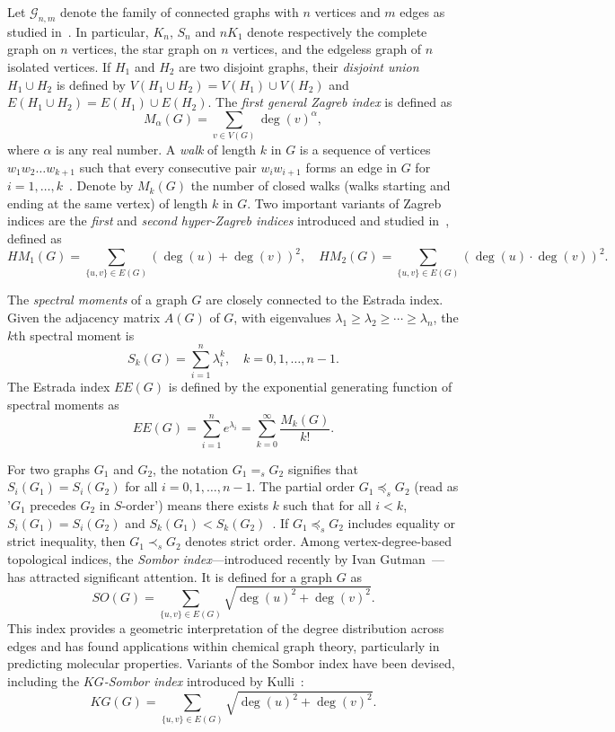 \documentclass{article}
\theoremstyle{definition}
\begin{document}
Let $\mathcal{G}_{n,m}$ denote the family of connected graphs with $n$ vertices and $m$ edges as studied in~\cite{Zhang2026WangXDH}. In particular, $K_n$, $S_n$ and $nK_1$ denote respectively the complete graph on $n$ vertices, the star graph on $n$ vertices, and the edgeless graph of $n$ isolated vertices. If $H_1$ and $H_2$ are two disjoint graphs, their \emph{disjoint union} $H_1 \cup H_2$ is defined by $V(H_1 \cup H_2) = V(H_1) \cup V(H_2)$ and $E(H_1 \cup H_2) = E(H_1) \cup E(H_2)$. The \emph{first general Zagreb index} is defined as 
\[
M_\alpha(G) = \sum_{v \in V(G)} \deg(v)^\alpha,
\]
where $\alpha$ is any real number. A \emph{walk} of length $k$ in $G$ is a sequence of vertices $w_1 w_2 \dots w_{k+1}$ such that every consecutive pair $w_i w_{i+1}$ forms an edge in $G$ for $i=1,\ldots,k$~\cite{Andriantiana2013WagnerEOD}. Denote by $M_k(G)$ the number of closed walks (walks starting and ending at the same vertex) of length $k$ in $G$. Two important variants of Zagreb indices are the \emph{first} and \emph{second hyper-Zagreb indices} introduced and studied in~\cite{Dehgardi2025AramHM}, defined as
\[
HM_1(G) = \sum_{\{u,v\} \in E(G)} \left( \deg(u) + \deg(v) \right)^2, \quad
HM_2(G) = \sum_{\{u,v\} \in E(G)} \left( \deg(u) \cdot \deg(v) \right)^2.
\]

The \emph{spectral moments} of a graph $G$ are closely connected to the Estrada index. Given the adjacency matrix $A(G)$ of $G$, with eigenvalues $\lambda_1 \geq \lambda_2 \geq \cdots \geq \lambda_n$, the $k$th spectral moment is
\[
S_k(G) = \sum_{i=1}^n \lambda_i^k, \quad k = 0,1,\dots,n-1.
\]
The Estrada index $EE(G)$ is defined by the exponential generating function of spectral moments as
\begin{equation}\label{eq1spectn1}
EE(G) = \sum_{i=1}^n e^{\lambda_i} = \sum_{k=0}^\infty \frac{M_k(G)}{k!}.
\end{equation}

For two graphs $G_1$ and $G_2$, the notation $G_1 =_s G_2$ signifies that $S_i(G_1) = S_i(G_2)$ for all $i = 0,1,\dots,n-1$. The partial order $G_1 \preceq_s G_2$ (read as '$G_1$ precedes $G_2$ in $S$-order') means there exists $k$ such that for all $i<k$, $S_i(G_1) = S_i(G_2)$ and $S_k(G_1) < S_k(G_2)$~\cite{Wang2016YuanHS}. If $G_1 \preceq_s G_2$ includes equality or strict inequality, then $G_1 \prec_s G_2$ denotes strict order. Among vertex-degree-based topological indices, the \emph{Sombor index}—introduced recently by Ivan Gutman~\cite{CruzGutman2021R,Dehgardi2025ATXari,Redµzepovi201I}—has attracted significant attention. It is defined for a graph $G$ as
\[
SO(G) = \sum_{\{u,v\} \in E(G)} \sqrt{\deg(u)^2 + \deg(v)^2}.
\]
This index provides a geometric interpretation of the degree distribution across edges and has found applications within chemical graph theory, particularly in predicting molecular properties. Variants of the Sombor index have been devised, including the \emph{$KG$-Sombor index} introduced by Kulli~\cite{Kulli2022VR}:
\begin{equation}\label{eq1Introduction}
KG(G) = \sum_{\{u,v\} \in E(G)} \sqrt{\deg(u)^2 + \deg(v)^2}.
\end{equation}
\end{document}
